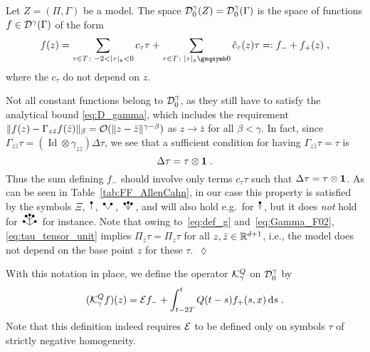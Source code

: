 \documentclass[reqno,11pt]{article}
\def\unit{\vone}
\DeclareMathOperator{\Id}{Id}
\def\abss#1{\abs{#1}_\mathfrak{s}}
\begin{document}
\begin{definition}
\label{def_Dgamma0}
Let $Z=(\Pi,\Gamma)$ be a model. 
The space ${\mathcal D}^\gamma_0(Z)={\mathcal D}^\gamma_0(\Gamma)$
is the space of functions $f \in {\mathcal D}^\gamma(\Gamma)$ of the form 
\begin{equation}
 \label{eq:def_Dgamma0}
 f(z) = \sum_{\tau\in T\colon -2 < \abss{\tau} < 0} c_\tau \tau +
\sum_{\tau\in T\colon\abss{\tau}\geqs0} \hat c_\tau(z)\tau =: f_- +
f_+(z)\;,
\end{equation}
where the $c_\tau$ do not depend on $z$. 
\end{definition}

\begin{remark}
\label{rem:Dgamma0}
Not all constant functions belong to ${\mathcal D}^\gamma_0$, as they still have to
satisfy the analytical bound \eqref{eq:D_gamma}, which includes the
requirement 
$\lVert f(z)-\Gamma_{z\bar z}f(\bar z)\rVert_\beta = {\mathcal O}(\lVert z-\bar z\rVert^{\gamma-\beta})$
as $z\rightarrow \bar z$ for all $\beta < \gamma$. In fact, since
$\Gamma_{z\bar z}\tau = (\Id\otimes\gamma_{z\bar z})\Delta\tau$, we see that a
sufficient condition for having $\Gamma_{z\bar z}\tau = \tau$ is 
\begin{equation}
 \label{eq:tau_tensor_unit}
 \Delta\tau = \tau\otimes\unit\;.
\end{equation}
Thus the sum defining $f_-$ should involve only terms $c_\tau \tau$ such that
$\Delta\tau = \tau\otimes\unit$. As can be seen in
Table~\ref{tab:FF_AllenCahn}, in our case this property is satisfied by the
symbols $\Xi$, $\RSI$, $\RSV$, $\RSW$, and will also hold e.g.\ for $\RSoI$, but
it does \emph{not} hold for $\RSWW$ for instance. Note that owing
to~\eqref{eq:def_g} and~\eqref{eq:Gamma_F02}, \eqref{eq:tau_tensor_unit}
implies $\Pi_{\bar z}\tau = \Pi_z\tau$ for all $z, \bar z\in\mathbb{R}^{d+1}$, i.e., the
model does not depend on the base point $z$ for these $\tau$.~$\lozenge$ 
\end{remark}

With this notation in place, we define the operator ${\mathcal K}^Q_\gamma$ on
${\mathcal D}^\gamma_0$ by 
\begin{equation}
\label{eq:def_KQ} 
  (\cK^Q_\gamma f)(z) = \cE f_- + \int_{t-2T}^t Q(t-s)f_+(s,x)\6s\;.
\end{equation}
Note that this definition indeed requires ${\mathcal E}$ to be defined only on symbols
$\tau$ of strictly negative homogeneity. 
\end{document}
